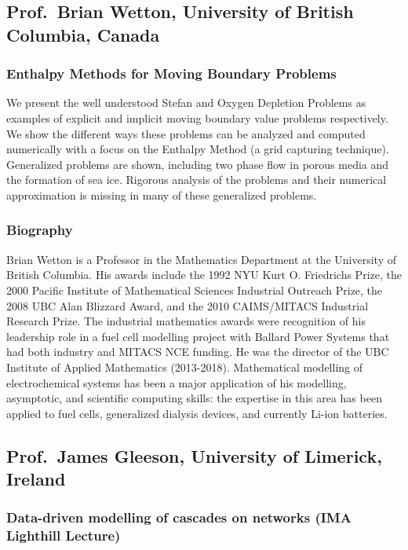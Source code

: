 \documentclass[12pt,a4paper]{article}
\begin{document}
\subsection{Prof.~Brian Wetton, University of British Columbia, Canada}

\subsubsection{Enthalpy Methods for Moving Boundary Problems}

We present the well understood Stefan and Oxygen Depletion Problems as examples of explicit and implicit moving boundary value problems respectively. We show the different ways these problems can be analyzed and computed numerically with a focus on the Enthalpy Method (a grid capturing technique). Generalized problems are shown, including two phase flow in porous media and the formation of sea ice. Rigorous analysis of the problems and their numerical approximation is missing in many of these generalized problems. 

\subsubsection{Biography}

Brian Wetton is a Professor in the Mathematics Department at the University of British Columbia. His awards include the 1992 NYU Kurt O. Friedrichs Prize, the 2000 Pacific Institute of Mathematical Sciences Industrial Outreach Prize, the 2008 UBC Alan Blizzard Award, and the 2010 CAIMS/MITACS Industrial Research Prize. The industrial mathematics awards were recognition of his leadership role in a fuel cell modelling project with Ballard Power Systems that had both industry and MITACS NCE funding. He was the director of the UBC Institute of Applied Mathematics (2013-2018). Mathematical modelling of electrochemical systems has been a major application of his modelling, asymptotic, and scientific computing skills: the expertise in this area has been applied to fuel cells, generalized dialysis devices, and currently Li-ion batteries.

\subsection{Prof.~James Gleeson, University of Limerick, Ireland}

\subsubsection{Data-driven modelling of cascades on networks (IMA Lighthill Lecture)}
\end{document}
